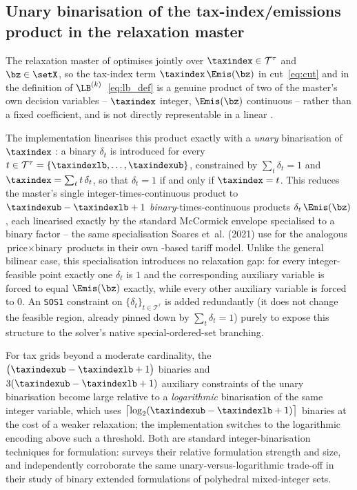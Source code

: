 \subsection{Unary binarisation of the tax-index/emissions product in
the relaxation master}
\label{app:impl_notes:unary}

The relaxation master of  optimises jointly over
$\taxindex\in\mathcal{T}^{\tau}$ and $\bz\in\setX$, so the tax-index term
$\taxindex\,\Emis(\bz)$ in cut~\eqref{eq:cut} and in the definition of
$\LB^{(k)}$~\eqref{eq:lb_def} is a genuine product of two of the
master's own decision variables -- $\taxindex$ integer, $\Emis(\bz)$
continuous -- rather than a fixed coefficient, and is not directly
representable in a linear \MILP.

The implementation linearises this product exactly with a \emph{unary}
binarisation of $\taxindex$ \citep{vielma2015, dashgunlukhildebrand2018}:
a binary $\delta_{t}$ is introduced for every
$t\in\mathcal{T}^{\tau}=\{\taxindexlb,\ldots,\taxindexub\}$, constrained by
$\sum_{t}\delta_{t}=1$ and $\taxindex=\sum_{t}t\,\delta_{t}$, so that
$\delta_{t}=1$ if and only if $\taxindex=t$. This reduces the master's
single integer-times-continuous product to $\taxindexub-\taxindexlb+1$
\emph{binary}-times-continuous products
$\delta_{t}\,\Emis(\bz)$, each linearised exactly by the standard
McCormick envelope specialised to a binary factor
\citep{mccormick1976} -- the same specialisation Soares et~al.
(2021) use for the analogous $\text{price}\times\text{binary}$
products in their own \DBP-based tariff model. Unlike the general
bilinear case, this specialisation introduces no relaxation gap: for
every integer-feasible point exactly one $\delta_{t}$ is $1$ and the
corresponding auxiliary variable is forced to equal $\Emis(\bz)$
exactly, while every other auxiliary variable is forced to $0$. An
\texttt{SOS1} constraint on $\{\delta_{t}\}_{t\in\mathcal{T}^{\tau}}$
is added redundantly (it does not change the feasible region, already
pinned down by $\sum_{t}\delta_{t}=1$) purely to expose this structure
to the solver's native special-ordered-set branching.

For tax grids beyond a moderate cardinality, the $\bigl(\taxindexub-\taxindexlb
+1\bigr)$ binaries and $3(\taxindexub-\taxindexlb+1)$ auxiliary constraints of
the unary binarisation become large relative to a \emph{logarithmic}
binarisation of the same integer variable, which uses
$\bigl\lceil\log_{2}(\taxindexub-\taxindexlb+1)\bigr\rceil$ binaries at the cost
of a weaker \LP relaxation; the implementation switches to the
logarithmic encoding above such a threshold. Both are standard
integer-binarisation techniques for \MILP formulation: \citet{vielma2015}
surveys their relative formulation strength and size, and
\citet{dashgunlukhildebrand2018} independently corroborate the same
unary-versus-logarithmic trade-off in their study of binary extended
formulations of polyhedral mixed-integer sets.
